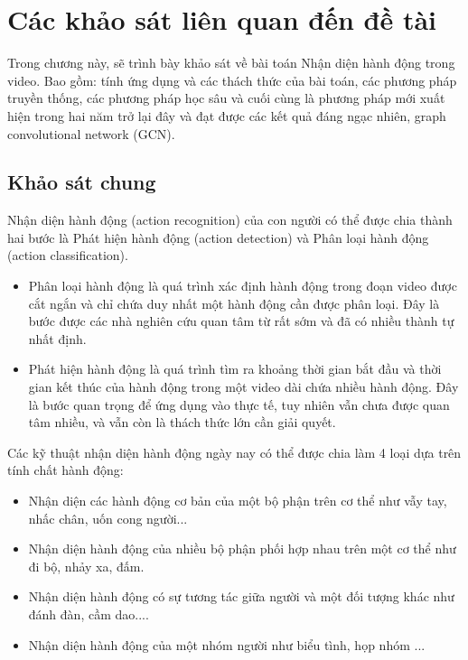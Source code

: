 \section{Các khảo sát liên quan đến đề tài}

Trong chương này, sẽ trình bày khảo sát về bài toán Nhận diện hành động trong video. Bao gồm: tính ứng dụng và các thách thức của bài toán, các phương pháp truyền thống, các phương pháp học sâu và cuối cùng là phương pháp mới xuất hiện trong hai năm trở lại đây và đạt được các kết quả đáng ngạc nhiên, graph convolutional network (GCN).

\subsection{Khảo sát chung}
Nhận diện hành động (action recognition) của con người có thể được chia thành hai bước là Phát hiện hành động (action detection) và Phân loại hành động (action classification).

\begin{itemize}
    \item Phân loại hành động là quá trình xác định hành động trong đoạn video được cắt ngắn và chỉ chứa duy nhất một hành động cần được phân loại. Đây là bước được các nhà nghiên cứu quan tâm từ rất sớm và đã có nhiều thành tự nhất định. %
    \item Phát hiện hành động là quá trình tìm ra khoảng thời gian bắt đầu và thời gian kết thúc của hành động trong một video dài chứa nhiều hành động. Đây là bước quan trọng để ứng dụng vào thực tế, tuy nhiên vẫn chưa được quan tâm nhiều, và vẫn còn là thách thức lớn cần giải quyết.
\end{itemize}

Các kỹ thuật nhận diện hành động ngày nay có thể được chia làm 4 loại dựa trên tính chất hành động:

\begin{itemize} %
    \item Nhận diện các hành động cơ bản của một bộ phận trên cơ thể như vẫy tay, nhấc chân, uốn cong người...
    \item Nhận diện hành động của nhiều bộ phận phối hợp nhau trên một cơ thể như đi bộ, nhảy xa, đấm.
    \item Nhận diện hành động có sự tương tác giữa người và một đối tượng khác như đánh đàn, cầm dao....
    \item Nhận diện hành động của một nhóm người như biểu tình, họp nhóm ...
\end{itemize}


